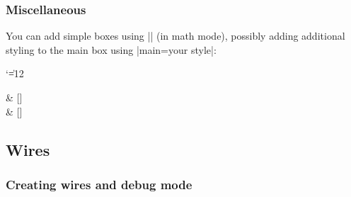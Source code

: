\documentclass[a4paper,doc2]{ltxdoc} %
\begin{document}
{\subsubsection{Miscellaneous}

\begin{pgfmanualentry}
  \def\extrakeytext{style, }
  \extractcommand\zxBox{}\@@
  \pgfmanualbody
  You can add simple boxes using || (in math mode), possibly adding additional styling to the main box using |main={your style}|:
{\catcode`\|=12 %
\begin{codeexample}[]
\begin{ZX}
   \rar[B]                    & [\zxwCol] \zxN{}\\
   \rar[B] & [\zxwCol] \zxN{}
\end{ZX}
\end{codeexample}
}
\end{pgfmanualentry}

\subsection{Wires}

\subsubsection{Creating wires and debug mode}

}
\end{document}

